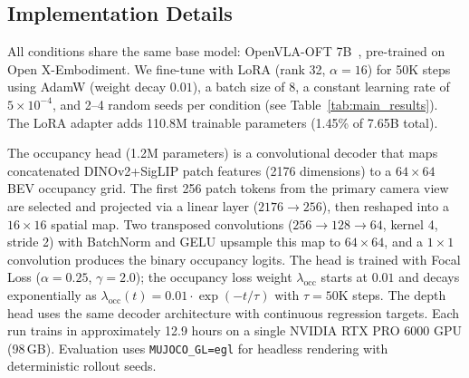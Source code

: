 \subsection{Implementation Details}

All conditions share the same base model: OpenVLA-OFT 7B~\cite{kim2025oft}, pre-trained on Open X-Embodiment. We fine-tune with LoRA (rank 32, $\alpha{=}16$) for 50K steps using AdamW (weight decay $0.01$), a batch size of 8, a constant learning rate of $5 \times 10^{-4}$, and 2--4 random seeds per condition (see Table~\ref{tab:main_results}). The LoRA adapter adds 110.8M trainable parameters (1.45\% of 7.65B total).

The occupancy head (1.2M parameters) is a convolutional decoder that maps concatenated DINOv2+SigLIP patch features (2176 dimensions) to a $64{\times}64$ BEV occupancy grid. The first 256 patch tokens from the primary camera view are selected and projected via a linear layer ($2176{\to}256$), then reshaped into a $16{\times}16$ spatial map. Two transposed convolutions ($256{\to}128{\to}64$, kernel 4, stride 2) with BatchNorm and GELU upsample this map to $64{\times}64$, and a $1{\times}1$ convolution produces the binary occupancy logits. The head is trained with Focal Loss ($\alpha{=}0.25$, $\gamma{=}2.0$); the occupancy loss weight $\lambda_{\text{occ}}$ starts at $0.01$ and decays exponentially as $\lambda_{\text{occ}}(t) = 0.01 \cdot \exp(-t/\tau)$ with $\tau{=}50$K steps. The depth head uses the same decoder architecture with continuous regression targets. Each run trains in approximately 12.9 hours on a single NVIDIA RTX PRO 6000 GPU (98\,GB). Evaluation uses \texttt{MUJOCO\_GL=egl} for headless rendering with deterministic rollout seeds.